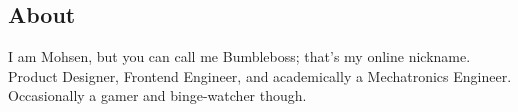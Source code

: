 \documentclass[9pt]{extarticle}
\begin{document}
  

  \setlength{\columnsep}{3em}
  
  \begin{paracol}{2}
    \begin{leftcolumn}
      
      
    \end{leftcolumn}
    
    \begin{rightcolumn}
      \sloppy\RaggedRight
      \section*{About}
      I am Mohsen, but you can call me \mbox{Bumbleboss}; that's my online nickname.
      Product Designer, Frontend Engineer, and academically a Mechatronics Engineer.
      Occasionally a gamer and binge-watcher though.
      
      
    \end{rightcolumn}
  \end{paracol}
\end{document}
